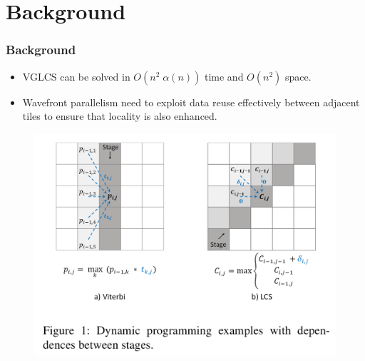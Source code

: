 \section{Background}

\begin{frame}
    \frametitle{Background}
    \begin{itemize}
    	\setlength\itemsep{1em}
    	\item VGLCS can be solved in $O(n^2 \; \alpha(n))$ time and $O(n^2)$ space.
    	\item Wavefront parallelism need to exploit data reuse effectively between adjacent tiles to ensure that locality is also enhanced.
    \end{itemize}
    \begin{figure}
		\includegraphics[scale=0.20]{figure/fig-wavefront-dp.png}
	\end{figure}
\end{frame}